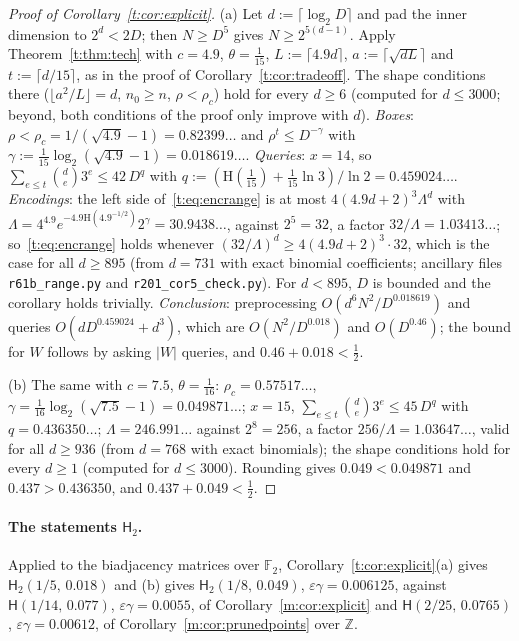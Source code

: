 \documentclass[11pt]{article}
\theoremstyle{definition}
\theoremstyle{remark}
\newcommand{\Z}{\mathbb{Z}}
\newcommand{\F}{\mathbb{F}_2}
\newcommand{\Hh}{\mathrm{H}}
\newcommand{\Hyp}{\mathsf{H}}
\newcommand{\EpsGammaVone}{0.0055}%
\newcommand{\EpsGammaBest}{0.00612}%
\newcommand{\HypPrunedEps}{2/25}%
\newcommand{\HypPrunedGamma}{0.0765}%
\newcommand{\CharTwoAgamma}{0.018}%
\newcommand{\CharTwoBgamma}{0.049}%
\newcommand{\CharTwoEpsGamma}{0.006125}%
\begin{document}
\begin{proof}[Proof of Corollary~\ref{t:cor:explicit}]
(a) Let $d:=\lceil\log_2D\rceil$ and pad the inner dimension to $2^d<2D$; then $N\ge D^5$ gives $N\ge2^{5(d-1)}$. Apply Theorem~\ref{t:thm:tech} with $c=4.9$, $\theta=\frac1{15}$, $L:=\lceil4.9d\rceil$, $a:=\lceil\sqrt{dL}\rceil$ and $t:=\lceil d/15\rceil$, as in the proof of Corollary~\ref{t:cor:tradeoff}. The shape conditions there ($\lfloor a^2/L\rfloor=d$, $n_0\ge n$, $\rho<\rho_c$) hold for every $d\ge6$ (computed for $d\le3000$; beyond, both conditions of the proof only improve with $d$). \emph{Boxes}: $\rho<\rho_c=1/(\sqrt{4.9}-1)=0.82399\ldots$ and $\rho^t\le D^{-\gamma}$ with $\gamma:=\frac1{15}\log_2(\sqrt{4.9}-1)=0.018619\ldots$. \emph{Queries}: $x=14$, so $\sum_{e\le t}\binom de3^e\le42\,D^q$ with $q:=(\Hh(\frac1{15})+\frac1{15}\ln3)/\ln2=0.459024\ldots$. \emph{Encodings}: the left side of~\eqref{t:eq:encrange} is at most $4(4.9d+2)^3\Lambda^d$ with $\Lambda=4^{4.9}e^{-4.9\Hh(4.9^{-1/2})}2^\gamma=30.9438\ldots$, against $2^5=32$, a factor $32/\Lambda=1.03413\ldots$; so~\eqref{t:eq:encrange} holds whenever $(32/\Lambda)^d\ge4(4.9d+2)^3\cdot32$, which is the case for all $d\ge895$ (from $d=731$ with exact binomial coefficients; ancillary files \texttt{r61b\_range.py} and \texttt{r201\_cor5\_check.py}). For $d<895$, $D$ is bounded and the corollary holds trivially. \emph{Conclusion}: preprocessing $O(d^6N^2/D^{0.018619})$ and queries $O(dD^{0.459024}+d^3)$, which are $O(N^2/D^{0.018})$ and $O(D^{0.46})$; the bound for $W$ follows by asking $|W|$ queries, and $0.46+0.018<\frac12$.

(b) The same with $c=7.5$, $\theta=\frac1{16}$: $\rho_c=0.57517\ldots$, $\gamma=\frac1{16}\log_2(\sqrt{7.5}-1)=0.049871\ldots$; $x=15$, $\sum_{e\le t}\binom de3^e\le45\,D^q$ with $q=0.436350\ldots$; $\Lambda=246.991\ldots$ against $2^8=256$, a factor $256/\Lambda=1.03647\ldots$, valid for all $d\ge936$ (from $d=768$ with exact binomials); the shape conditions hold for every $d\ge1$ (computed for $d\le3000$). Rounding gives $0.049<0.049871$ and $0.437>0.436350$, and $0.437+0.049<\frac12$.
\end{proof}

\paragraph{The statements $\Hyp_2$.} Applied to the biadjacency matrices over $\F$, Corollary~\ref{t:cor:explicit}(a) gives $\Hyp_2(1/5,\,\CharTwoAgamma)$ and (b) gives $\Hyp_2(1/8,\,\CharTwoBgamma)$, $\varepsilon\gamma=\CharTwoEpsGamma$, against $\Hyp(1/14,\,0.077)$, $\varepsilon\gamma=\EpsGammaVone$, of Corollary~\ref{m:cor:explicit} and $\Hyp(\HypPrunedEps,\,\HypPrunedGamma)$, $\varepsilon\gamma=\EpsGammaBest$, of Corollary~\ref{m:cor:prunedpoints} over $\Z$.
\end{document}
